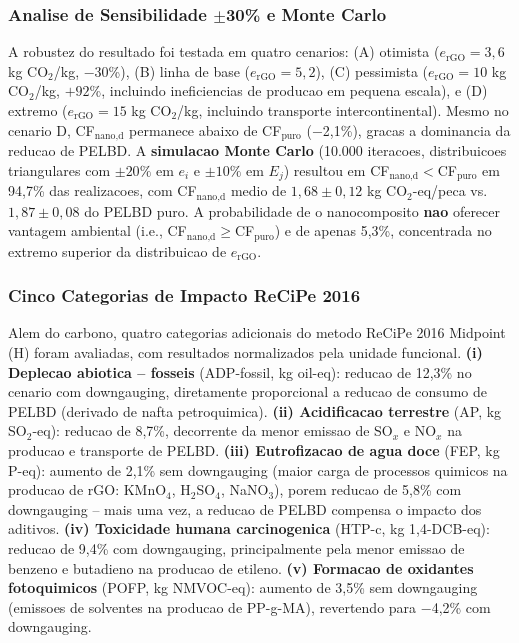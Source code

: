 \documentclass[11pt,a4paper,oneside]{article}
\begin{document}
\subsubsection{Analise de Sensibilidade $\pm$30\% e Monte Carlo}

A robustez do resultado foi testada em quatro cenarios: (A) otimista ($e_{\text{rGO}}{=}3{,}6$ kg CO$_2$/kg, $-$30\%), (B) linha de base ($e_{\text{rGO}}{=}5{,}2$), (C) pessimista ($e_{\text{rGO}}{=}10$ kg CO$_2$/kg, $+92\%$, incluindo ineficiencias de producao em pequena escala), e (D) extremo ($e_{\text{rGO}}{=}15$ kg CO$_2$/kg, incluindo transporte intercontinental). Mesmo no cenario D, CF$_{\text{nano,d}}$ permanece abaixo de CF$_{\text{puro}}$ ($-$2{,}1\%), gracas a dominancia da reducao de PELBD. A {\bfseries simulacao Monte Carlo} (10.000 iteracoes, distribuicoes triangulares com $\pm20\%$ em $e_i$ e $\pm10\%$ em $E_j$) resultou em CF$_{\text{nano,d}}{<}$CF$_{\text{puro}}$ em 94,7\% das realizacoes, com CF$_{\text{nano,d}}$ medio de $1{,}68{\pm}0{,}12$ kg CO$_2$-eq/peca vs. $1{,}87{\pm}0{,}08$ do PELBD puro. A probabilidade de o nanocomposito {\bfseries nao} oferecer vantagem ambiental (i.e., CF$_{\text{nano,d}}{\ge}$CF$_{\text{puro}}$) e de apenas 5,3\%, concentrada no extremo superior da distribuicao de $e_{\text{rGO}}$.

\subsubsection{Cinco Categorias de Impacto ReCiPe 2016}

Alem do carbono, quatro categorias adicionais do metodo ReCiPe 2016 Midpoint (H) foram avaliadas, com resultados normalizados pela unidade funcional. {\bfseries (i) Deplecao abiotica -- fosseis} (ADP-fossil, kg oil-eq): reducao de 12,3\% no cenario com downgauging, diretamente proporcional a reducao de consumo de PELBD (derivado de nafta petroquimica). {\bfseries (ii) Acidificacao terrestre} (AP, kg SO$_2$-eq): reducao de 8,7\%, decorrente da menor emissao de SO$_x$ e NO$_x$ na producao e transporte de PELBD. {\bfseries (iii) Eutrofizacao de agua doce} (FEP, kg P-eq): aumento de 2,1\% sem downgauging (maior carga de processos quimicos na producao de rGO: KMnO$_4$, H$_2$SO$_4$, NaNO$_3$), porem reducao de 5,8\% com downgauging -- mais uma vez, a reducao de PELBD compensa o impacto dos aditivos. {\bfseries (iv) Toxicidade humana carcinogenica} (HTP-c, kg 1,4-DCB-eq): reducao de 9,4\% com downgauging, principalmente pela menor emissao de benzeno e butadieno na producao de etileno. {\bfseries (v) Formacao de oxidantes fotoquimicos} (POFP, kg NMVOC-eq): aumento de 3,5\% sem downgauging (emissoes de solventes na producao de PP-g-MA), revertendo para $-$4,2\% com downgauging.
\end{document}
